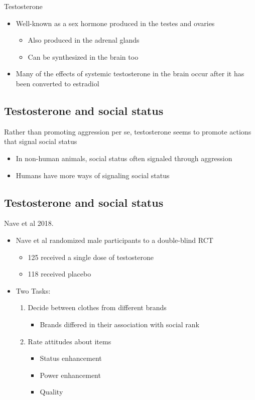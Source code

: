 Testosterone
\begin{itemize}
    \item Well-known as a sex hormone produced in the testes and ovaries
    \begin{itemize}
        \item Also produced in the adrenal glands
        \item Can be synthesized in the brain too
        
    \end{itemize}
    \item Many of the effects of systemic testosterone in the brain occur after it has been converted to estradiol
\end{itemize}
\subsection{Testosterone and social status}
Rather than promoting aggression per se, testosterone seems to promote actions that signal social status
\begin{itemize}
    \item In non-human animals, social status often signaled through aggression
    \item Humans have more ways of signaling social status
\end{itemize}
 \subsection{Testosterone and social status}
 Nave et al 2018.
\begin{itemize}
    \item Nave et al randomized male participants to a double-blind RCT
    \begin{itemize}
        \item 125 received a single dose of testosterone
        \item 118 received placebo
    \end{itemize}
    \item Two Tasks:
    \begin{enumerate}
        \item Decide between clothes from different brands
        \begin{itemize}
            \item Brands differed in their association with social rank
        \end{itemize}
        \item Rate attitudes about items
        \begin{itemize}
            \item Status enhancement
            \item Power enhancement
            \item Quality
        \end{itemize}
    \end{enumerate}
\end{itemize}
